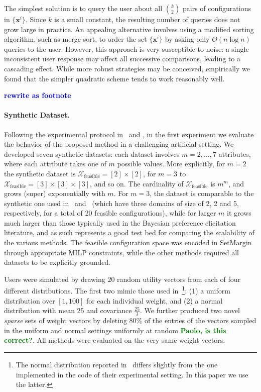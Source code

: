 \documentclass{article}
\renewcommand\[{\begin{equation}}
\renewcommand\]{\end{equation}}
\newcommand{\calvar}[1]{\ensuremath{\mathcal{#1}}}
\newcommand{\calX}{\calvar{X}}
\newcommand{\vecvar}[1]{\ensuremath{\boldsymbol{#1}}}
\newcommand{\vx}{\vecvar{x}}
\newcommand{\andrea}[1]{{\bf \textcolor{blue}{{\fbox{Andrea:} #1}}}}
\newcommand{\stefano}[1]{{\bf \textcolor{green}{{\fbox{Stefano:} #1}}}}
\begin{document}
The simplest solution is to query the user about all $k \choose 2$ pairs of
configurations in $\{\vx^i\}$. Since $k$ is a small constant, the resulting
number of queries does not grow large in practice.  An appealing alternative
involves using a modified sorting algorithm, such as merge-sort, to order the
set $\{\vx^i\}$ by asking only $O(n\log n)$ queries to the user. However, this
approach is very susceptible to noise: a single inconsistent user response may
affect all successive comparisons, leading to a cascading effect. While more
robust strategies may be conceived, empirically we found that the simpler
quadratic scheme tends to work reasonably well.

\andrea{rewrite as footnote}

\paragraph{Synthetic Dataset.} Following the experimental protocol
in~\cite{guo2010real} and \cite{viappiani2010optimal}, in the first experiment
we evaluate the behavior of the proposed method in a challenging artificial
setting. We developed seven synthetic datasets: each dataset involves
$m=2,\ldots,7$ attributes, where each attribute takes one of $m$ possible
values. More explicitly, for $m=2$ the synthetic dataset is
$\calX_\text{feasible} = [2] \times [2]$, for $m=3$ to $\calX_\text{feasible} =
[3] \times [3] \times [3]$, and so on. The cardinality of
$\calX_\text{feasible}$ is $m^m$, and grows (super) exponentially with $m$. For
$m=3$, the dataset is comparable to the synthetic one used
in~\cite{guo2010real} and~\cite{viappiani2010optimal} (which have three domains
of size of 2, 2 and 5, respectively, for a total of 20 feasible
configurations), while for larger $m$ it grows much larger than those typically
used in the Bayesian preference elicitation literature, and as such represents
a good test bed for comparing the scalability of the various methods.
The feasible configuration space was encoded in {\sc SetMargin} through
appropriate MILP constraints, while the other methods required all datasets to
be explicitly grounded.

Users were simulated by drawing $20$ random utility vectors from each of four
different distributions. The first two mimic those used
in~\cite{guo2010real}\footnote{The normal distribution reported
in~\cite{guo2010real} differs slightly from the one implemented in the code of
their experimental setting. In this paper we use the latter.}:
(1) a uniform distribution over $[1, 100]$ for each individual weight, and (2)
a normal distribution with mean $25$ and covariance
$\frac{25}{3}$.  We further produced two novel
{\em sparse} sets of weight vectors by deleting $80\%$ of the entries of the
vectors sampled in the uniform and normal settings uniformly at random
\stefano{Paolo, is this correct?}. All methods were evaluated on the very same
weight vectors.
\end{document}
